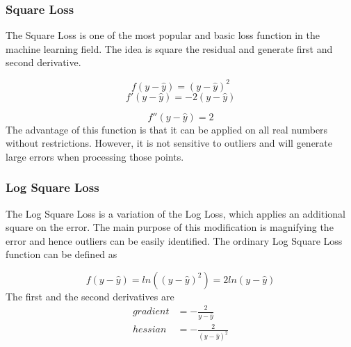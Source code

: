 \documentclass[runningheads]{llncs}
\begin{document}
\subsubsection{Square Loss}
The Square Loss is one of the most popular and basic loss function in the machine learning field. The idea is square the residual and generate first and second derivative.

\[f(y-\hat{y}) = (y-\hat{y})^2\]
\begin{equation}
  f'(y - \hat{y})= -2(y-\hat{y})
\end{equation}

\begin{equation}
  f''(y - \hat{y})= 2
\end{equation}
The advantage of this function is that it can be applied on all real numbers without restrictions. However, it is not sensitive to outliers and will generate large errors when processing those points.
\subsubsection{Log Square Loss}
The Log Square Loss is a variation of the Log Loss, which applies an additional square on the error. The main purpose of this modification is magnifying the error and hence outliers can be easily identified. The ordinary Log Square Loss function can be defined as

\begin{equation}
	f(y - \hat{y}) = ln((y-\hat{y})^2) = 2ln(y-\hat{y})
\end{equation}
The first and the second derivatives are 
\begin{equation}\label{5.1.2.1}
	\begin{split}
		gradient & = -\frac{2}{y - \hat{y}} \\
		hessian & = -\frac{2}{(y - \hat{y})^2}
	\end{split}
\end{equation}
\end{document}
